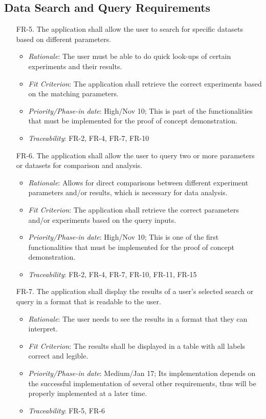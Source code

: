 \documentclass[12pt]{article}
\begin{document}
\subsection{Data Search and Query Requirements}
\begin{enumerate}
  \item[FR-5.] The application shall allow the user to search for specific datasets based on different parameters.
  \begin{itemize}
    \item \textit{Rationale}: The user must be able to do quick look-ups of certain experiments and their results.
    \item \textit{Fit Criterion}: The application shall retrieve the correct experiments based on the matching parameters.
    \item \textit{Priority/Phase-in date}: High/Nov 10; This is part of the functionalities that must be implemented for the proof of concept demonstration.
    \item \textit{Traceability}: FR-2, FR-4, FR-7, FR-10
  \end{itemize}
  \item[FR-6.] The application shall allow the user to query two or more parameters or datasets for comparison and analysis.
  \begin{itemize}
    \item \textit{Rationale}: Allows for direct comparisons between different experiment parameters and/or results, which is necessary for data analysis.
    \item \textit{Fit Criterion}: The application shall retrieve the correct parameters and/or experiments based on the query inputs.
    \item \textit{Priority/Phase-in date}: High/Nov 10; This is one of the first functionalities that must be implemented for the proof of concept demonstration.
    \item \textit{Traceability}: FR-2, FR-4, FR-7, FR-10, FR-11, FR-15
  \end{itemize}
  \item[FR-7.] The application shall display the results of a user’s selected search or query in a format that is readable to the user.
  \begin{itemize}
    \item \textit{Rationale}: The user needs to see the results in a format that they can interpret.
    \item \textit{Fit Criterion}: The results shall be displayed in a table with all labels correct and legible.
    \item \textit{Priority/Phase-in date}: Medium/Jan 17; Its implementation depends on the successful implementation of several other requirements, thus will be properly implemented at a later time.
    \item \textit{Traceability}: FR-5, FR-6
  \end{itemize}
\end{enumerate}
\end{document}
